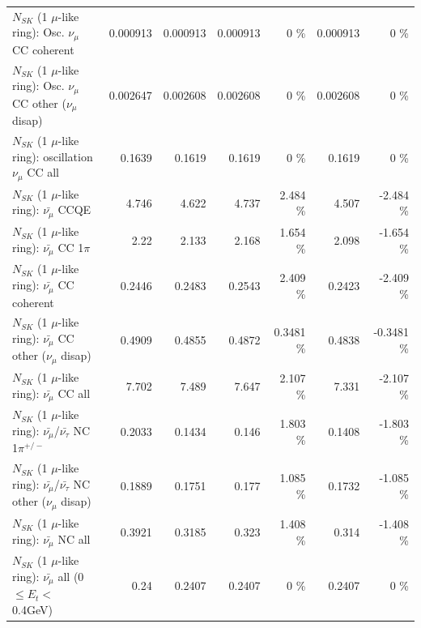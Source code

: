 \begin{table}
\begin{tabular}{| l | r | r | r  r | r  r |}
                        $N_{SK}$ (1 $\mu$-like ring): Osc. $\nu_\mu$ CC coherent &        0.000913 &        0.000913 &        0.000913 &        0 \%  &        0.000913 &        0 \%  \\ 
         $N_{SK}$ (1 $\mu$-like ring): Osc. $\nu_\mu$ CC other ($\nu_\mu$ disap) &        0.002647 &        0.002608 &        0.002608 &        0 \%  &        0.002608 &        0 \%  \\ 
                      $N_{SK}$ (1 $\mu$-like ring): oscillation $\nu_\mu$ CC all &          0.1639 &          0.1619 &          0.1619 &        0 \%  &          0.1619 &        0 \%  \\ 
\hline
\hline
                              $N_{SK}$ (1 $\mu$-like ring): $\bar{\nu_\mu}$ CCQE &           4.746 &           4.622 &           4.737 &    2.484 \%  &           4.507 &   -2.484 \%  \\ 
                         $N_{SK}$ (1 $\mu$-like ring): $\bar{\nu_\mu}$ CC 1$\pi$ &            2.22 &           2.133 &           2.168 &    1.654 \%  &           2.098 &   -1.654 \%  \\ 
                       $N_{SK}$ (1 $\mu$-like ring): $\bar{\nu_\mu}$ CC coherent &          0.2446 &          0.2483 &          0.2543 &    2.409 \%  &          0.2423 &   -2.409 \%  \\ 
        $N_{SK}$ (1 $\mu$-like ring): $\bar{\nu_\mu}$ CC other ($\nu_\mu$ disap) &          0.4909 &          0.4855 &          0.4872 &   0.3481 \%  &          0.4838 &  -0.3481 \%  \\ 
                          $N_{SK}$ (1 $\mu$-like ring): $\bar{\nu_{\mu}}$ CC all &           7.702 &           7.489 &           7.647 &    2.107 \%  &           7.331 &   -2.107 \%  \\ 
\hline
  $N_{SK}$ (1 $\mu$-like ring): $\bar{\nu_\mu}$/$\bar{\nu_\tau}$ NC 1$\pi^{+/-}$ &          0.2033 &          0.1434 &           0.146 &    1.803 \%  &          0.1408 &   -1.803 \%  \\ 
$N_{SK}$ (1 $\mu$-like ring): $\bar{\nu_\mu}$/$\bar{\nu_\tau}$ NC other ($\nu_\mu$ disap) &          0.1889 &          0.1751 &           0.177 &    1.085 \%  &          0.1732 &   -1.085 \%  \\ 
                          $N_{SK}$ (1 $\mu$-like ring): $\bar{\nu_{\mu}}$ NC all &          0.3921 &          0.3185 &           0.323 &    1.408 \%  &           0.314 &   -1.408 \%  \\ 
\hline
   $N_{SK}$ (1 $\mu$-like ring): $\bar{\nu_{\mu}}$ all (0 $\leq E_{t} <$ 0.4GeV) &            0.24 &          0.2407 &          0.2407 &        0 \%  &          0.2407 &        0 \%  \\ 

\end{tabular}
\end{table}
